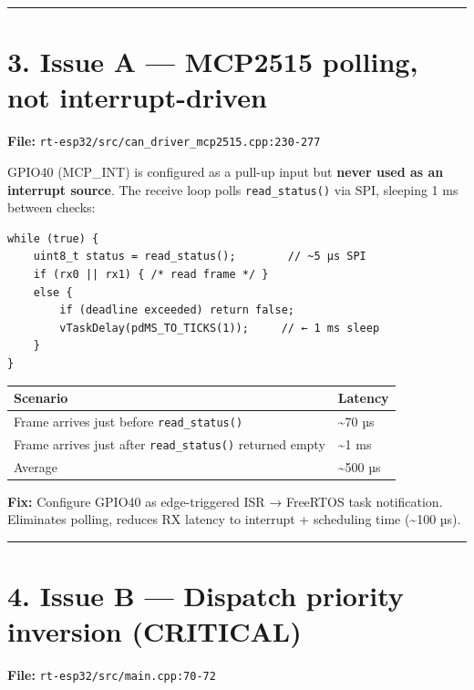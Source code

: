 \documentclass[12pt,a4paper,oneside]{report}
\begin{document}
\begin{center}\rule{0.5\linewidth}{0.5pt}\end{center}

\section{3. Issue A --- MCP2515 polling, not
interrupt-driven}\label{issue-a-mcp2515-polling-not-interrupt-driven}

\textbf{File:} \texttt{rt-esp32/src/can\_driver\_mcp2515.cpp:230-277}

GPIO40 (MCP\_INT) is configured as a pull-up input but \textbf{never used as an
interrupt source}. The receive loop polls \texttt{read\_status()} via SPI,
sleeping 1 ms between checks:

\begin{verbatim}
while (true) {
    uint8_t status = read_status();        // ~5 µs SPI
    if (rx0 || rx1) { /* read frame */ }
    else {
        if (deadline exceeded) return false;
        vTaskDelay(pdMS_TO_TICKS(1));     // ← 1 ms sleep
    }
}
\end{verbatim}

\begin{longtable}[]{@{}ll@{}}
\toprule\noalign{}
Scenario & Latency \\
\midrule\noalign{}
\endhead
\bottomrule\noalign{}
\endlastfoot
Frame arrives just before \texttt{read\_status()} & \textasciitilde70 µs \\
Frame arrives just after \texttt{read\_status()} returned empty &
\textasciitilde1 ms \\
Average & \textasciitilde500 µs \\
\end{longtable}

\textbf{Fix:} Configure GPIO40 as edge-triggered ISR → FreeRTOS task
notification. Eliminates polling, reduces RX latency to interrupt + scheduling
time (\textasciitilde100 µs).

\begin{center}\rule{0.5\linewidth}{0.5pt}\end{center}

\section{4. Issue B --- Dispatch priority inversion
(CRITICAL)}\label{issue-b-dispatch-priority-inversion-critical}

\textbf{File:} \texttt{rt-esp32/src/main.cpp:70-72}
\end{document}
